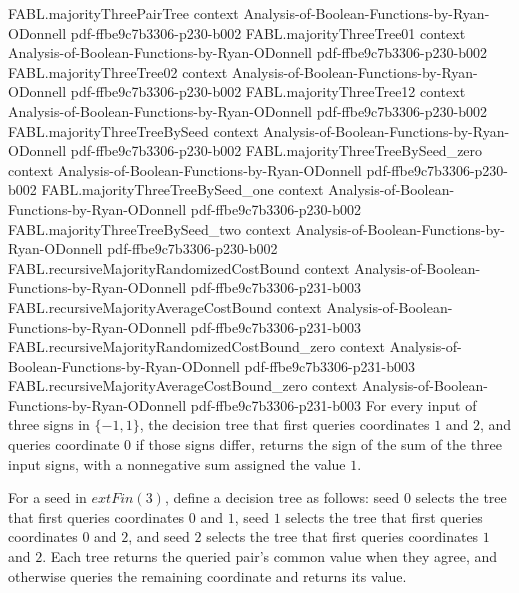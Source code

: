 \begin{theorem}
\proofstep
  {FABL.majorityThreePairTree}
  {context}
  {Analysis-of-Boolean-Functions-by-Ryan-ODonnell}
  {pdf-ffbe9c7b3306-p230-b002}
\proofstep
  {FABL.majorityThreeTree01}
  {context}
  {Analysis-of-Boolean-Functions-by-Ryan-ODonnell}
  {pdf-ffbe9c7b3306-p230-b002}
\proofstep
  {FABL.majorityThreeTree02}
  {context}
  {Analysis-of-Boolean-Functions-by-Ryan-ODonnell}
  {pdf-ffbe9c7b3306-p230-b002}
\proofstep
  {FABL.majorityThreeTree12}
  {context}
  {Analysis-of-Boolean-Functions-by-Ryan-ODonnell}
  {pdf-ffbe9c7b3306-p230-b002}
\proofstep
  {FABL.majorityThreeTreeBySeed}
  {context}
  {Analysis-of-Boolean-Functions-by-Ryan-ODonnell}
  {pdf-ffbe9c7b3306-p230-b002}
\proofstep
  {FABL.majorityThreeTreeBySeed_zero}
  {context}
  {Analysis-of-Boolean-Functions-by-Ryan-ODonnell}
  {pdf-ffbe9c7b3306-p230-b002}
\proofstep
  {FABL.majorityThreeTreeBySeed_one}
  {context}
  {Analysis-of-Boolean-Functions-by-Ryan-ODonnell}
  {pdf-ffbe9c7b3306-p230-b002}
\proofstep
  {FABL.majorityThreeTreeBySeed_two}
  {context}
  {Analysis-of-Boolean-Functions-by-Ryan-ODonnell}
  {pdf-ffbe9c7b3306-p230-b002}
\proofstep
  {FABL.recursiveMajorityRandomizedCostBound}
  {context}
  {Analysis-of-Boolean-Functions-by-Ryan-ODonnell}
  {pdf-ffbe9c7b3306-p231-b003}
\proofstep
  {FABL.recursiveMajorityAverageCostBound}
  {context}
  {Analysis-of-Boolean-Functions-by-Ryan-ODonnell}
  {pdf-ffbe9c7b3306-p231-b003}
\proofstep
  {FABL.recursiveMajorityRandomizedCostBound_zero}
  {context}
  {Analysis-of-Boolean-Functions-by-Ryan-ODonnell}
  {pdf-ffbe9c7b3306-p231-b003}
\proofstep
  {FABL.recursiveMajorityAverageCostBound_zero}
  {context}
  {Analysis-of-Boolean-Functions-by-Ryan-ODonnell}
  {pdf-ffbe9c7b3306-p231-b003}
For every input of three signs in $\{-1,1\}$, the decision tree that first queries
coordinates $1$ and $2$, and queries coordinate $0$ if those signs differ, returns the
sign of the sum of the three input signs, with a nonnegative sum assigned the value $1$.
\end{theorem}

\begin{definition}
\label{FABL.majorityThreeTreeBySeed}
\leanok
{}
For a seed in $	ext{Fin}(3)$, define a decision tree as follows: seed $0$ selects the
tree that first queries coordinates $0$ and $1$, seed $1$ selects the tree that first
queries coordinates $0$ and $2$, and seed $2$ selects the tree that first queries
coordinates $1$ and $2$. Each tree returns the queried pair's common value when they
agree, and otherwise queries the remaining coordinate and returns its value.
\end{definition}

